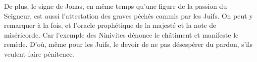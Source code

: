De plus, le signe de Jonas,
	en même temps qu’une figure de la passion du Seigneur,
	est aussi l’attestation des graves péchés commis par les Juifs.
On peut y remarquer à la fois,
	et l’oracle prophétique de la majesté et la note de miséricorde.
Car l’exemple des Ninivites dénonce le châtiment et manifeste le remède.
D’où, même pour les Juifs,
	le devoir de ne pas désespérer du pardon, s’ils veulent faire pénitence.
